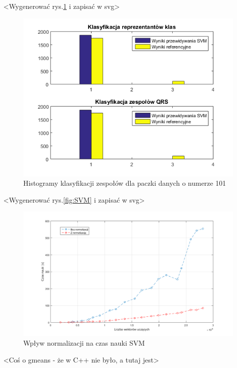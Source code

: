 <Wygenerować rys.\ref{fig:hist1} i zapisać w svg>
\begin{figure}[!htp]
	\centering
	\includegraphics[width=15cm]{Grafika/101_2_3}
	\caption{Histogramy klasyfikacji zespołów dla paczki danych o numerze 101}
	\label{fig:hist1}
\end{figure}

<Wygenerować rys.\ref{fig:SVM} i zapisać w svg>
\begin{figure}[!htp]
	\centering
	\includegraphics[width=16cm]{Grafika/SVMTrain}
	\caption{Wpływ normalizacji na czas nauki SVM}
	\label{fig:TrainNormSVM}
\end{figure}

<Coś o gmeans - że w C++ nie było, a tutaj jest>

